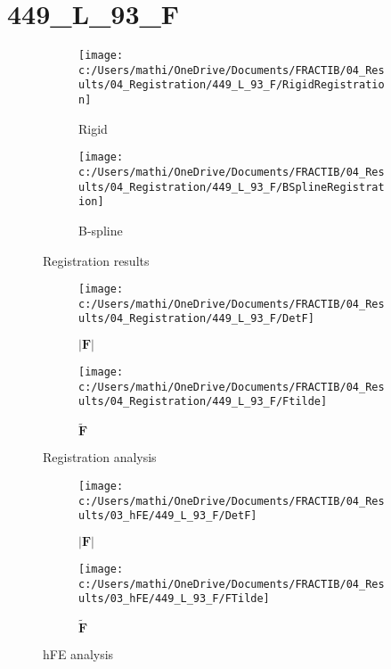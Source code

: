 \documentclass{article}%
\begin{document}
%
\newpage%
\section*{449\_L\_93\_F}%
\label{sec:449L93F}%


\begin{figure}[h!]%
\begin{subfigure}[b]{0.5\linewidth}%
\texttt{[image: c:/Users/mathi/OneDrive/Documents/FRACTIB/04\_Results/04\_Registration/449\_L\_93\_F/RigidRegistration]}%
\caption{Rigid}%
\end{subfigure}%
\begin{subfigure}[b]{0.5\linewidth}%
\texttt{[image: c:/Users/mathi/OneDrive/Documents/FRACTIB/04\_Results/04\_Registration/449\_L\_93\_F/BSplineRegistration]}%
\caption{B{-}spline}%
\end{subfigure}%
\caption{Registration results}%
\end{figure}

%


\begin{figure}[h!]%
\begin{subfigure}[b]{0.5\linewidth}%
\texttt{[image: c:/Users/mathi/OneDrive/Documents/FRACTIB/04\_Results/04\_Registration/449\_L\_93\_F/DetF]}%
\caption{$|\mathbf{F}|$}%
\end{subfigure}%
\begin{subfigure}[b]{0.5\linewidth}%
\texttt{[image: c:/Users/mathi/OneDrive/Documents/FRACTIB/04\_Results/04\_Registration/449\_L\_93\_F/Ftilde]}%
\caption{$\tilde{\mathbf{F}}$}%
\end{subfigure}%
\caption{Registration analysis}%
\end{figure}

%


\begin{figure}[h!]%
\begin{subfigure}[b]{0.5\linewidth}%
\texttt{[image: c:/Users/mathi/OneDrive/Documents/FRACTIB/04\_Results/03\_hFE/449\_L\_93\_F/DetF]}%
\caption{$|\mathbf{F}|$}%
\end{subfigure}%
\begin{subfigure}[b]{0.5\linewidth}%
\texttt{[image: c:/Users/mathi/OneDrive/Documents/FRACTIB/04\_Results/03\_hFE/449\_L\_93\_F/FTilde]}%
\caption{$\tilde{\mathbf{F}}$}%
\end{subfigure}%
\caption{hFE analysis}%
\end{figure}
\end{document}
